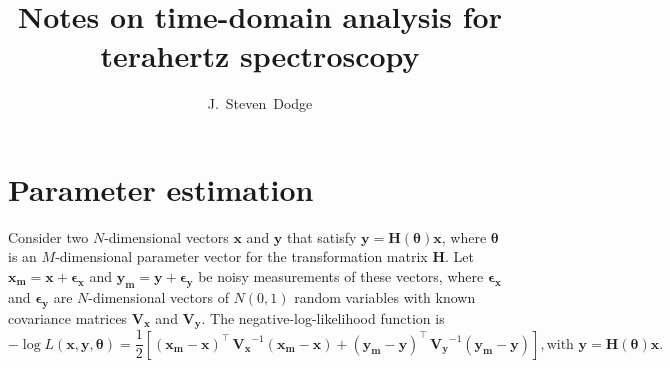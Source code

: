 \documentclass[aps, prb, onecolumn, floatfix, amssymb, superscriptaddress, nofootinbib, longbibliography]{revtex4-2}
\begin{document}
\title{Notes on time-domain analysis for terahertz spectroscopy}

\author{J.~Steven~Dodge}


\maketitle

\section{Parameter estimation}
Consider two $N$-dimensional vectors $\bm{x}$ and $\bm{y}$ that satisfy $\bm{y} = \bm{H}(\bm{\theta})\bm{x}$, where $\bm{\theta}$ is an $M$-dimensional parameter vector for the transformation matrix $\bm{H}$. Let $\bm{x_m} = \bm{x} + \bm{\epsilon_x}$ and $\bm{y_m} = \bm{y} + \bm{\epsilon_y}$ be noisy measurements of these vectors, where $\bm{\epsilon_x}$ and $\bm{\epsilon_y}$ are $N$-dimensional vectors of $N(0,1)$ random variables with  known covariance matrices  $\bm{V_x}$ and $\bm{V_y}$. The negative-log-likelihood function is
\[
-\log L(\mathbf{x},\mathbf{y},\boldsymbol{\theta}) = \frac{1}{2}\left[(\mathbf{x_{m}} - \mathbf{x})^\intercal\,\mathbf{V_x}^{-1}(\mathbf{x_{m}} - \mathbf{x}) + (\mathbf{y_{m}} - \mathbf{y})^\intercal\,\mathbf{V_y}^{-1}(\mathbf{y_{m}} - \mathbf{y})\right], \text{with } \mathbf{y} = \mathbf{H}(\boldsymbol{\theta})\mathbf{x}.
\]
\end{document}
